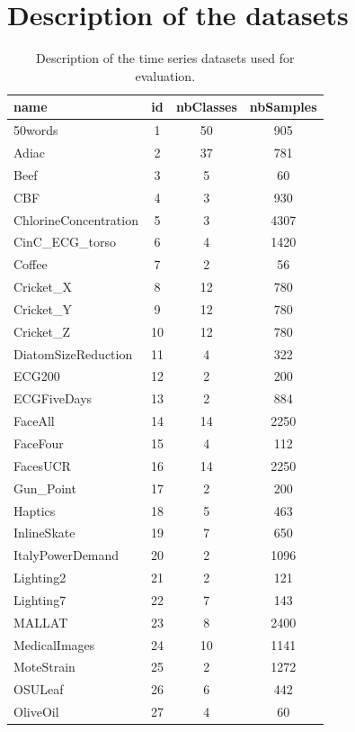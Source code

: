 \documentclass[twoside,11pt]{article}
\begin{document}
\appendix

\section{Description of the datasets}
\label{sec:appendix}
  
\begin{table} [h!]
\begin{center}
\caption{Description of the time series datasets used for evaluation.} 
\label{didtNoda1}  
\small 
 \setlength{\tabcolsep}{.16667em} 
\begin{tabular}{lccc} 
name & id & nbClasses & nbSamples \\ 
\hline 
50words &  1 & 50 &  905 \\ 
Adiac &  2 & 37 &  781 \\ 
Beef &  3 &  5 &   60 \\ 
CBF &  4 &  3 &  930 \\ 
ChlorineConcentration &  5 &  3 & 4307 \\ 
CinC\_ECG\_torso &  6 &  4 & 1420 \\ 
Coffee &  7 &  2 &   56 \\ 
Cricket\_X &  8 & 12 &  780 \\ 
Cricket\_Y &  9 & 12 &  780 \\ 
Cricket\_Z & 10 & 12 &  780 \\ 
DiatomSizeReduction & 11 &  4 &  322 \\ 
ECG200 & 12 &  2 &  200 \\ 
ECGFiveDays & 13 &  2 &  884 \\ 
FaceAll & 14 & 14 & 2250 \\ 
FaceFour & 15 &  4 &  112 \\ 
FacesUCR & 16 & 14 & 2250 \\ 
Gun\_Point & 17 &  2 &  200 \\ 
Haptics & 18 &  5 &  463 \\ 
InlineSkate & 19 &  7 &  650 \\ 
ItalyPowerDemand & 20 &  2 & 1096 \\ 
Lighting2 & 21 &  2 &  121 \\ 
Lighting7 & 22 &  7 &  143 \\ 
MALLAT & 23 &  8 & 2400 \\ 
MedicalImages & 24 & 10 & 1141 \\ 
MoteStrain & 25 &  2 & 1272 \\ 
OSULeaf & 26 &  6 &  442 \\ 
OliveOil & 27 &  4 &   60 \\ 

\end{tabular}
\end{center}
\end{table}
\end{document}

